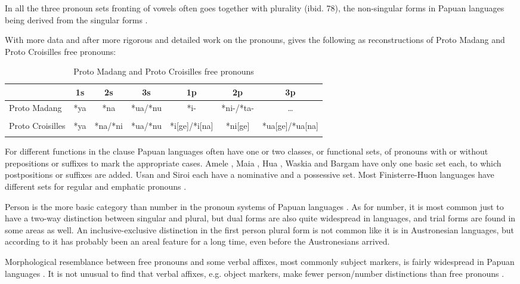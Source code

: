 In all the three pronoun sets fronting of vowels often goes together with plurality (ibid. 78), the non-singular forms in Papuan languages being derived from the singular forms \citep[361]{Franklin1979}. 

With more data and after more rigorous and detailed work on the  pronouns, \citet[5]{Ross1995} gives the following as reconstructions of Proto Madang and Proto Croisilles free pronouns:

\begin{table}
\begin{tabular}{lcccccc}
\mytoprule
 & 1s & 2s & 3s & 1p & 2p & 3p\\ 
\midrule
\parbox{1.1cm}{Proto Madang} & *ya & *na & *ua/*nu & *i- & *ni-/*ta- & {\dots}\\ 
\\
\parbox{1.1cm}{Proto Croisilles} & *ya & *na/*ni & *ua/*nu & *i[ge]/*i[na] & *ni[ge] & *ua[ge]/*ua[na]\\
\mybottomrule
\end{tabular}
\caption{Proto Madang and Proto Croisilles free pronouns}
\label{tab:8}
\end{table}

For different functions in the clause Papuan languages often have one or two classes, or functional sets, of pronouns with or without prepositions or suffixes to mark the appropriate cases. Amele \citep{Roberts1987}, Maia \citep[71]{Hardin2002}, Hua \citep[215]{Haiman1980}, Waskia \citep[53]{RossEtAl1978}%
 and Bargam \citep[29]{Hepner2002} have only one basic set each, to which postpositions or suffixes are added. Usan \citep{Reesink1987} and Siroi \citep{Wells1979} each have a nominative and a possessive set. Most Finisterre-Huon languages have different sets for regular and emphatic pronouns \citep{McElhanon1973}.

Person is the more basic category than number in the pronoun systems of Papuan languages \citep[69]{Foley1986}. As for number, it is most common just to have a two-way distinction between singular and plural, but dual forms are also quite widespread in  languages, and trial forms are found in some areas as well. An inclusive-exclusive distinction in the first person plural form is not common \citep[60]{Wurm1982} like it is in Austronesian languages, but according to \citet[56]{Ross2005} it has probably been an areal feature for a long time, even before the Austronesians arrived. 

Morphological resemblance between free pronouns and some verbal affixes, most commonly subject markers, is fairly widespread in Papuan languages \citep{Franklin1979}. It is not unusual to find that verbal affixes, e.g. object markers, make fewer person/number distinctions than free pronouns \citep[67]{Foley1986}.

